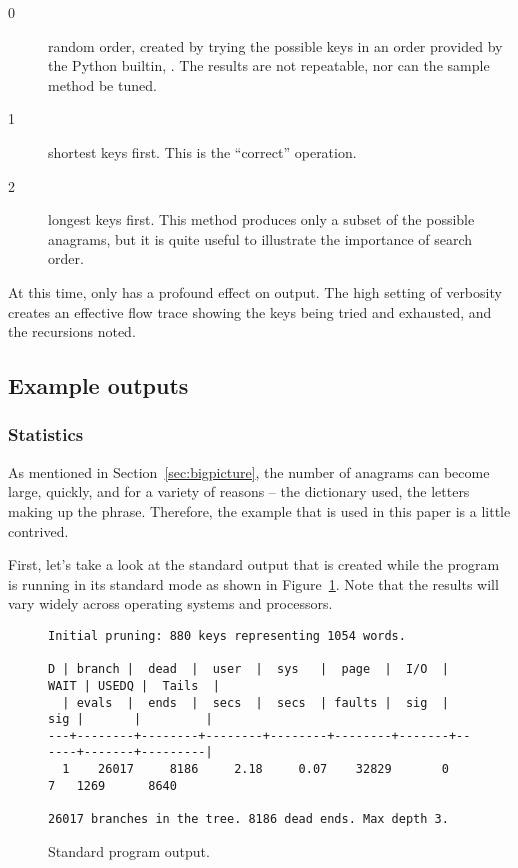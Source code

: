 \documentclass[letterpaper, 11pt]{article}
\begin{document}
\begin{description}
\begin{description}
\item[0] random order, created by trying the possible keys in 
an order provided by the Python builtin, . The
results are not repeatable, nor can the sample method be tuned.

\item[1] shortest keys first. This is the ``correct''
operation.

\item[2] longest keys first. This method produces only a subset of
the possible anagrams, but it is quite useful to illustrate the
importance of search order.

\end{description}

\item[\lit{--verbose}] At this time, only  has a profound
effect on output. The high setting of verbosity creates an effective
flow trace showing the keys being tried and exhausted, and the
recursions noted.

\end{description}

\subsection{Example outputs}

\subsubsection{Statistics}

As mentioned in Section~\ref{sec:bigpicture}, the number of anagrams
can become large, quickly, and for a variety of reasons -- the
dictionary used, the letters making up the phrase. Therefore, the
example that is used in this paper is a little contrived.

First, let's take a look at the standard output that is created
while the program is running in its standard mode as shown
in Figure~\ref{fig:stdoutput}.  Note that the
results will vary widely across operating systems and processors.

\begin{figure}
\small
\begin{verbatim}
Initial pruning: 880 keys representing 1054 words.

D | branch |  dead  |  user  |  sys   |  page  |  I/O  | WAIT | USEDQ |  Tails  |
  | evals  |  ends  |  secs  |  secs  | faults |  sig  |  sig |       |         |
---+--------+--------+--------+--------+--------+-------+------+-------+---------|
  1    26017     8186     2.18     0.07    32829       0      7   1269      8640

26017 branches in the tree. 8186 dead ends. Max depth 3.
\end{verbatim}
\normalsize
\caption{Standard program output.}
\label{fig:stdoutput}
\end{figure}
\end{document}
